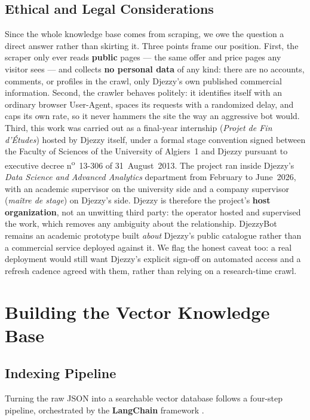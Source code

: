 \documentclass[12pt, a4paper]{report}
\newcommand{\humantext}[1]{#1}      %
\begin{document}
\subsection{Ethical and Legal Considerations}
\humantext{Since the whole knowledge base comes from scraping, we owe the question a direct answer rather than skirting it. Three points frame our position. First, the scraper only ever reads \textbf{public} pages --- the same offer and price pages any visitor sees --- and collects \textbf{no personal data} of any kind: there are no accounts, comments, or profiles in the crawl, only Djezzy's own published commercial information. Second, the crawler behaves politely: it identifies itself with an ordinary browser User-Agent, spaces its requests with a randomized delay, and caps its own rate, so it never hammers the site the way an aggressive bot would. Third, this work was carried out as a final-year internship (\textit{Projet de Fin d'\'Etudes}) hosted by Djezzy itself, under a formal stage convention signed between the Faculty of Sciences of the University of Algiers~1 and Djezzy pursuant to executive decree n\textsuperscript{o}~13-306 of 31~August~2013. The project ran inside Djezzy's \textit{Data Science and Advanced Analytics} department from February to June~2026, with an academic supervisor on the university side and a company supervisor (\textit{ma\^itre de stage}) on Djezzy's side. Djezzy is therefore the project's \textbf{host organization}, not an unwitting third party: the operator hosted and supervised the work, which removes any ambiguity about the relationship. DjezzyBot remains an academic prototype built \emph{about} Djezzy's public catalogue rather than a commercial service deployed against it.} \humantext{We flag the honest caveat too: a real deployment would still want Djezzy's explicit sign-off on automated access and a refresh cadence agreed with them, rather than relying on a research-time crawl.}

\section{Building the Vector Knowledge Base}

\subsection{Indexing Pipeline}
\humantext{Turning the raw JSON into a searchable vector database follows a four-step pipeline, orchestrated by the \textbf{LangChain} framework \cite{chase2022langchain}.}
\end{document}
